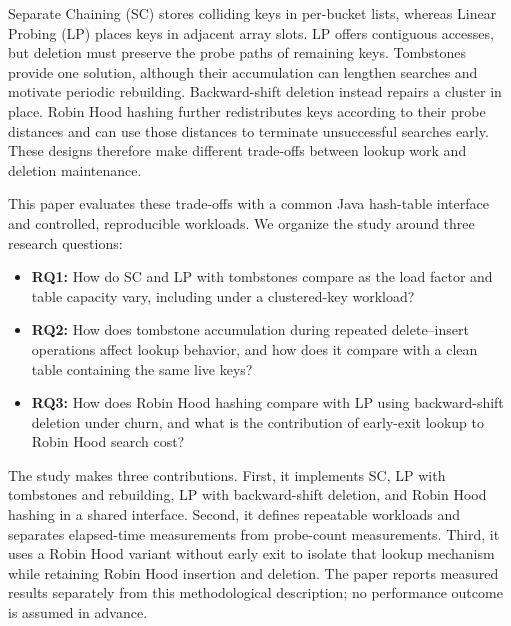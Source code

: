 \documentclass[conference]{IEEEtran}
\begin{document}
Separate Chaining (SC) stores colliding keys in per-bucket lists, whereas
Linear Probing (LP) places keys in adjacent array slots. LP offers contiguous
accesses, but deletion must preserve the probe paths of remaining keys.
Tombstones provide one solution, although their accumulation can lengthen
searches and motivate periodic rebuilding. Backward-shift deletion instead
repairs a cluster in place. Robin Hood hashing further redistributes keys
according to their probe distances and can use those distances to terminate
unsuccessful searches early. These designs therefore make different trade-offs
between lookup work and deletion maintenance.

This paper evaluates these trade-offs with a common Java hash-table interface
and controlled, reproducible workloads. We organize the study around three
research questions:
\begin{itemize}
    \item \textbf{RQ1:} How do SC and LP with tombstones compare as the load
    factor and table capacity vary, including under a clustered-key workload?
    \item \textbf{RQ2:} How does tombstone accumulation during repeated
    delete--insert operations affect lookup behavior, and how does it compare
    with a clean table containing the same live keys?
    \item \textbf{RQ3:} How does Robin Hood hashing compare with LP using
    backward-shift deletion under churn, and what is the contribution of
    early-exit lookup to Robin Hood search cost?
\end{itemize}

The study makes three contributions. First, it implements SC, LP with
tombstones and rebuilding, LP with backward-shift deletion, and Robin Hood
hashing in a shared interface. Second, it defines repeatable workloads and
separates elapsed-time measurements from probe-count measurements. Third, it
uses a Robin Hood variant without early exit to isolate that lookup mechanism
while retaining Robin Hood insertion and deletion. The paper reports measured
results separately from this methodological description; no performance
outcome is assumed in advance.
\end{document}
